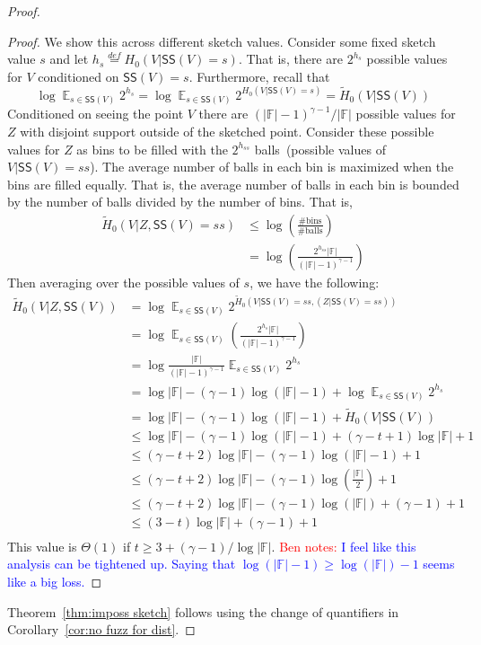 \documentclass[11pt]{article}
\newcommand{\thref}[1]{\mbox{Theorem~\ref{#1}}}
\newcommand{\corref}[1]{\mbox{Corollary~\ref{#1}}}
\DeclareMathOperator*{\expe}{\mathbb{E}}
\newcommand{\class}[1]{{\ensuremath{\mathsf{#1}}}}
\newcommand{\sketch}{\ensuremath{\class{SS}}\xspace}
\newcommand{\authnote}[2]{{\textcolor{red}{\textsf{#1 notes: }\textcolor{blue}{ #2}}\marginpar{\textcolor{red}{\textbf{!!!!!}}}}}
\newcommand{\authnote}[2]{}
\newcommand{\bnote}[1]{{\authnote{Ben}{#1}}}
\begin{document}
\begin{proof}
\begin{proof}
We show this across different sketch values.  Consider some fixed sketch value $s$ and let $h_s \overset{def}= H_0(V | \sketch(V) = s)$.  That is, there are $2^{h_s}$ possible values for $V$ conditioned on $\sketch(V) = s$.  Furthermore, recall that 
\[
\log \expe_{s\in \sketch(V)} 2^{h_s} = \log \expe_{s\in \sketch(V)} 2^{H_0(V | \sketch(V) = s)}  = \tilde{H}_0(V | \sketch(V)) %
\]  
Conditioned on seeing the point $V$ there are $(|\mathbb{F}|-1)^{\gamma-1}/|\mathbb{F}|$ possible values for $Z$ with disjoint support outside of the sketched point.  Consider these possible values for $Z$ as bins to be filled with the $2^{h_{ss}}$ balls~(possible values of $V | \sketch(V)=ss$).  The average number of balls in each bin is maximized when the bins are filled equally.  That is, the average number of balls in each bin is bounded by the number of balls divided by the number of bins.  That is, 
\begin{align*}
\tilde{H}_0(V |Z  , \sketch(V) = ss) &\le \log \left(\frac{\text{\# bins}}{\text{\# balls}}\right)\\
&= \log \left(\frac{2^{h_{ss}}|\mathbb{F}|}{(|\mathbb{F}|-1)^{\gamma-1}} \right)
\end{align*}
Then averaging over the possible values of $s$, we have the following:
\begin{align*}
\tilde{H}_0(V |Z , \sketch(V) ) &= \log \expe_{s\in \sketch(V)} 2^{\tilde{H}_0(V |  \sketch(V) =ss , (Z| \sketch(V) =ss) )}\\
&= \log\expe_{s\in \sketch(V)} \left(\frac{2^{h_s}|\mathbb{F}|}{(|\mathbb{F}|-1)^{\gamma-1}} \right)\\
&= \log \frac{|\mathbb{F}|}{(|\mathbb{F}|-1)^{\gamma-1}} \expe_{s\in \sketch(V)} 2^{h_s}\\
&=\log |\mathbb{F}| - (\gamma -1)\log (|\mathbb{F}|-1) + \log \expe_{s\in \sketch(V)} 2^{h_s}\\
&=\log |\mathbb{F}| - (\gamma -1)\log (|\mathbb{F}|-1) + \tilde{H}_0(V | \sketch(V))\\ 
&\le \log |\mathbb{F}| - (\gamma -1)\log (|\mathbb{F}|-1) + (\gamma-t+1)\log |\mathbb{F}|+1\\
&\le (\gamma-t+2)\log |\mathbb{F}| - (\gamma-1) \log (|\mathbb{F}|-1)+1\\
&\le (\gamma-t+2)\log |\mathbb{F}| - (\gamma-1) \log (\frac{|\mathbb{F}|}{2})+1\\
&\le (\gamma-t+2)\log |\mathbb{F}| - (\gamma-1) \log (|\mathbb{F}|) + (\gamma -1)+1\\
&\le (3-t)\log |\mathbb{F}| + (\gamma -1)+1\\
\end{align*}
This value is $\Theta(1)$ if $t\ge 3+ (\gamma-1)/\log | \mathbb{F}|$. \bnote{ I feel like this analysis can be tightened up.  Saying that $\log (|\mathbb{F}| -1 ) \ge \log (|\mathbb{F}|)-1$ seems like a big loss.}
 \end{proof}
\noindent \thref{thm:imposs sketch} follows using the change of quantifiers in \corref{cor:no fuzz for dist}.
\end{proof}
\end{document}
